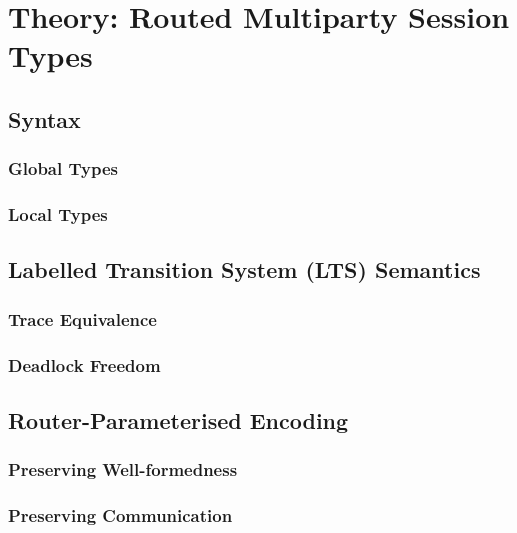 \chapter{Theory: Routed Multiparty Session Types}

\section{Syntax}

\subsection{Global Types}

\subsection{Local Types}

\section{Labelled Transition System (LTS) Semantics}

\subsection{Trace Equivalence}

\subsection{Deadlock Freedom}

\section{Router-Parameterised Encoding}

\subsection{Preserving Well-formedness}

\subsection{Preserving Communication}